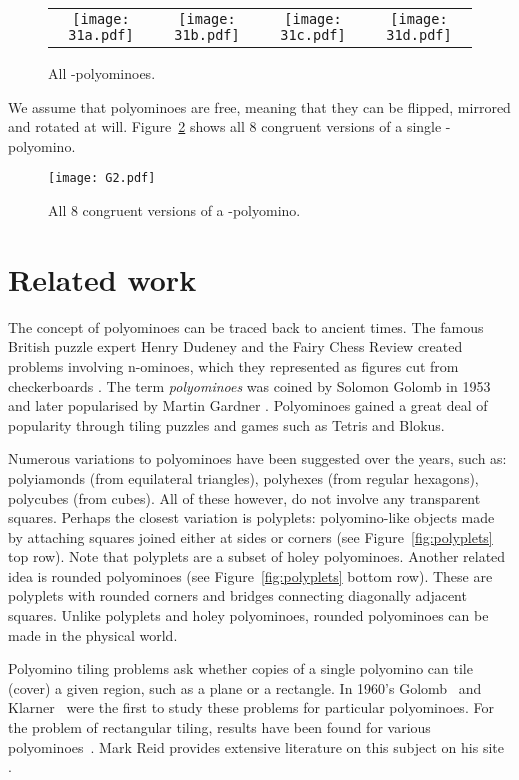 \documentclass[10pt,a4paper]{article}
\theoremstyle{definition}
\begin{document}
\begin{figure}[!htpb]
\centering
\begin{tabular}{cccc}
\texttt{[image: 31a.pdf]} & \texttt{[image: 31b.pdf]} &
\texttt{[image: 31c.pdf]} & \texttt{[image: 31d.pdf]} 
\end{tabular}
\caption{All -polyominoes.}
\label{fig:31}
\end{figure}

We assume that polyominoes are free, meaning that they can be flipped, mirrored and rotated at will. 
Figure~\ref{fig:G} shows all 8 congruent versions of a single -polyomino.

\begin{figure}[!htpb]
\centering
\texttt{[image: G2.pdf]}
\caption{All 8 congruent versions of a -polyomino.}
\label{fig:G}
\end{figure}


\section{Related work}

The concept of polyominoes can be traced back to ancient times. The famous British puzzle expert Henry Dudeney and the Fairy Chess Review
created problems involving n-ominoes, which they represented as figures cut from checkerboards \cite{klarner65}.
The term \emph{polyominoes} was coined by Solomon Golomb in 1953 and later popularised by Martin Gardner \cite{golomb96}.
Polyominoes gained a great deal of popularity through tiling puzzles and games such as Tetris and Blokus.

Numerous variations to polyominoes have been suggested over the years, such as: polyiamonds (from equilateral triangles),
polyhexes (from regular hexagons), polycubes (from cubes). All of these however, do not involve any transparent squares.
Perhaps the closest variation is polyplets: polyomino-like objects made by attaching squares joined either at sides
or corners (see Figure~\ref{fig:polyplets} top row). Note that polyplets are a subset of holey polyominoes. Another related idea is rounded
polyominoes \cite{Harsh} (see Figure~\ref{fig:polyplets} bottom row). These are polyplets with rounded corners and bridges connecting diagonally adjacent squares.
Unlike polyplets and holey polyominoes, rounded polyominoes can be made in the physical world.

Polyomino tiling problems ask whether copies of a single polyomino can tile (cover) a given region, such as a plane or a rectangle.
In 1960's Golomb~\cite{golomb66} and Klarner~\cite{klarner65,klarner69} were the first to study these problems for particular polyominoes.
For the problem of rectangular tiling, results have been found for various polyominoes~\cite{Reid:results,Friedman:rectifiable}. Mark Reid
provides extensive literature on this subject on his site \cite{Reid:literature}.
\end{document}
